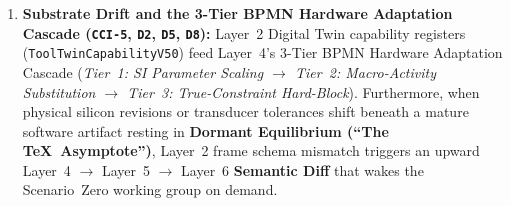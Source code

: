 \begin{enumerate}
    \item \textbf{Substrate Drift and the 3-Tier BPMN Hardware Adaptation Cascade (\texttt{CCI-5}, \texttt{D2}, \texttt{D5}, \texttt{D8}):} Layer~2 Digital Twin capability registers (\texttt{ToolTwinCapabilityV50}) feed Layer~4's 3-Tier BPMN Hardware Adaptation Cascade (\textit{Tier~1: SI Parameter Scaling $\to$ Tier~2: Macro-Activity Substitution $\to$ Tier~3: True-Constraint Hard-Block}). Furthermore, when physical silicon revisions or transducer tolerances shift beneath a mature software artifact resting in \textbf{Dormant Equilibrium (``The \TeX\ Asymptote'')}, Layer~2 frame schema mismatch triggers an upward Layer~4 $\to$ Layer~5 $\to$ Layer~6 \textbf{Semantic Diff} that wakes the Scenario~Zero working group on demand.
\end{enumerate}

